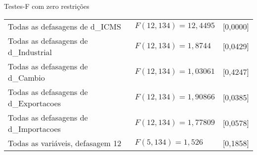 \documentclass[11pt]{article}
\begin{document}
\begin{center}
Testes-F com zero restrições\\[1em]
\begin{tabular}{lll}
Todas as defasagens de d\_ICMS & $F(12, 134) = 12,4495$ & [0,0000]\\
Todas as defasagens de d\_Industrial & $F(12, 134) = 1,8744$ & [0,0429]\\
Todas as defasagens de d\_Cambio & $F(12, 134) = 1,03061$ & [0,4247]\\
Todas as defasagens de d\_Exportacoes & $F(12, 134) = 1,90866$ & [0,0385]\\
Todas as defasagens de d\_Importacoes & $F(12, 134) = 1,77809$ & [0,0578]\\
Todas as variáveis, defasagem 12 & $F(5, 134) = 1,526$ & [0,1858]\\
\end{tabular}
\end{center}

\clearpage
\end{document}

